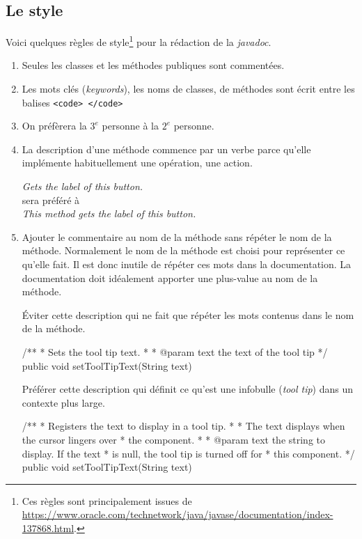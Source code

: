 \subsection{Le style}

Voici quelques règles de style\footnote{Ces règles sont principalement issues de \url{https://www.oracle.com/technetwork/java/javase/documentation/index-137868.html}.} pour la rédaction de la \textit{javadoc}.

\begin{enumerate}
	
	\item Seules les classes et les méthodes publiques sont commentées. 

	\item Les mots clés (\textit{keywords}), les noms de classes, de méthodes
		sont écrit entre les balises \texttt{<code> </code>} 

	\item On préfèrera la $3^e$ personne à la $2^e$ personne. 

	\item La description d'une méthode commence par un verbe parce qu'elle
		implémente habituellement une opération, une action. 
	
		\medskip 
		\textit{Gets the label of this button.} \\
		sera préféré à \\
		\textit{This method gets the label of this button.}

	\item Ajouter le commentaire au nom de la méthode sans répéter le nom de la
		méthode. Normalement le nom de la méthode est choisi pour représenter
		ce qu'elle fait. Il est donc inutile de répéter ces mots dans la
		documentation. La documentation doit idéalement apporter une plus-value
		au nom de la méthode. 

		\medskip
		Éviter cette description qui ne fait que répéter les mots contenus 
		dans le nom de la méthode.
		\begin{java}
		/**
		  * Sets the tool tip text.
		  *
		  * @param text the text of the tool tip
		  */
		  public void setToolTipText(String text)
		\end{java}
		
		Préférer cette description qui définit ce qu'est une infobulle 
		(\textit{tool tip}) dans un contexte plus large. 
		\begin{java}
		/**
		  * Registers the text to display in a tool tip. 
		  * 
		  * The text displays when the cursor lingers over 
		  * the component.         
		  *
		  * @param text the string to display. If the text 
		  * is null, the tool tip is turned off for 
		  * this component. 
		  */
		  public void setToolTipText(String text)
		\end{java}


\end{enumerate}
